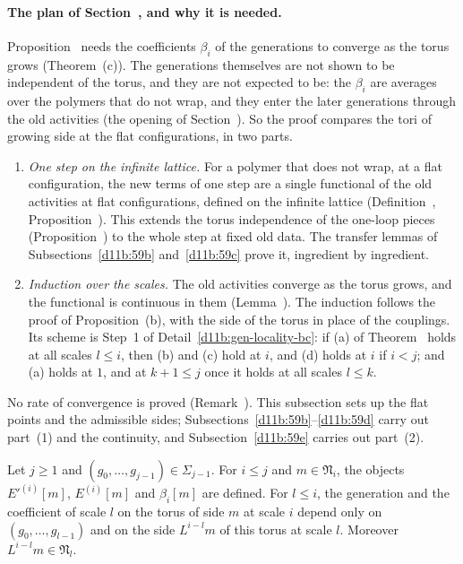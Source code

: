 \paragraph{The plan of Section~, and why it is needed.} Proposition~ needs the coefficients $\beta_i$ of the generations to converge as the torus grows (Theorem~(c)). The generations themselves are not shown to be independent of the torus, and they are not expected to be: the $\beta_i$ are averages over the polymers that do not wrap, and they enter the later generations through the old activities (the opening of Section~). So the proof compares the tori of growing side at the flat configurations, in two parts.
\begin{enumerate}[label=(\arabic*)]
\item \emph{One step on the infinite lattice.} For a polymer that does not wrap, at a flat configuration, the new terms of one step are a single functional of the old activities at flat configurations, defined on the infinite lattice (Definition~, Proposition~). This extends the torus independence of the one-loop pieces (Proposition~) to the whole step at fixed old data. The transfer lemmas of Subsections~\ref{d11b:59b} and~\ref{d11b:59c} prove it, ingredient by ingredient.
\item \emph{Induction over the scales.} The old activities converge as the torus grows, and the functional is continuous in them (Lemma~). The induction follows the proof of Proposition~(b), with the side of the torus in place of the couplings. Its scheme is Step~1 of Detail~\ref{d11b:gen-locality-bc}: if (a) of Theorem~ holds at all scales $l\le i$, then (b) and (c) hold at $i$, and (d) holds at $i$ if $i<j$; and (a) holds at $1$, and at $k+1\le j$ once it holds at all scales $l\le k$.
\end{enumerate}
No rate of convergence is proved (Remark~). This subsection sets up the flat points and the admissible sides; Subsections~\ref{d11b:59b}--\ref{d11b:59d} carry out part~(1) and the continuity, and Subsection~\ref{d11b:59e} carries out part~(2).

\begin{detail}\label{d11b:gl-setting}
Let $j\ge1$ and $(g_0,\dots,g_{j-1})\in\Sigma_{j-1}$. For $i\le j$ and $m\in\mathfrak N_i$, the objects $E'^{(i)}[m]$, $E^{(i)}[m]$ and $\beta_i[m]$ are defined. For $l\le i$, the generation and the coefficient of scale $l$ on the torus of side $m$ at scale $i$ depend only on $(g_0,\dots,g_{l-1})$ and on the side $L^{i-l}m$ of this torus at scale $l$. Moreover $L^{i-l}m\in\mathfrak N_l$.
\end{detail}

